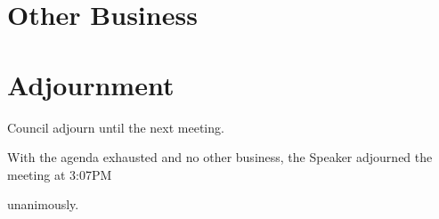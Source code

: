 \documentclass[12pt, letterpaper]{article}
\begin{document}
\hypersetup{} %
\noindent








\section*{Other Business}

\section*{Adjournment}

\begin{motion}
    \birt Council adjourn until the next meeting.
    
    With the agenda exhausted and no other business, the Speaker adjourned the
    meeting at 3:07PM

    \carries unanimously.
\end{motion}


\end{document}
